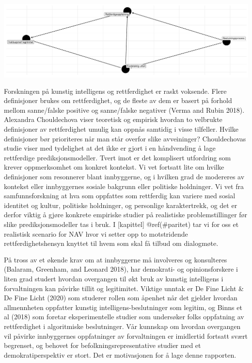 \documentclass[
]{book}
\begin{document}
\includegraphics{NAV_files/figure-latex/dag-1.pdf}

Forskningen på kunstig intelligens og rettferdighet er raskt voksende.
Flere definisjoner brukes om rettferdighet, og de fleste av dem er basert på forhold mellom sanne/falske positive og sanne/falske negativer (Verma and Rubin 2018).
Alexandra Chouldechova \citet{chouldechova2018case} viser teoretisk og empirisk hvordan to velbrukte definisjoner av rettferdighet umulig kan oppnås samtidig i visse tilfeller.
Hvilke definisjoner bør prioriteres når man står overfor slike avveininger?
Chouldechovas studie viser med tydelighet at det ikke er gjort i en håndvending å lage rettferdige prediksjonsmodeller.
Tvert imot er det komplisert utfordring som krever oppmerksomhet om konkret kontekst.
Vi vet fortsatt lite om hvilke definisjoner som resonnerer blant innbyggerne, og i hvilken grad de modereres av kontekst eller innbyggernes sosiale bakgrunn eller politiske holdninger.
Vi vet fra samfunnsforskning at hva som oppfattes som rettferdig kan variere med sosial identitet og kultur, politiske holdninger, og personlige karaktertrekk, og det er derfor viktig å gjøre konkrete empiriske studier på realistiske problemstillinger før slike prediksjonsmodeller tas i bruk.
I {[}kapittel{]} @ref(\#paritet) tar vi for oss et realistisk scenario for NAV hvor vi setter opp to motstridende rettferdighetshensyn knyttet til hvem som skal få tilbud om dialogmøte.

På tross av et økende krav om at innbyggerne må involveres og konsulteres (Balaram, Greenham, and Leonard 2018), har demokrati- og opinionsforskere i liten grad studert hvordan overgangen til økt bruk av kunstig intelligens i forvaltningen kan påvirke tillit og legitimitet.
Viktige unntak er De Fine Licht \& De Fine Licht (2020) som studerer rollen som åpenhet når det gjelder hvordan allmennheten oppfatter kunstig intelligens-beslutninger som legitim, og Binns et al (2018) som foretar eksperimentelle studier som undersøker folks oppfatning av rettferdighet i algoritmiske beslutninger.
Vår kunnskap om hvordan overgangen vil påvirke innbyggernes oppfatninger av forvaltningen er imidlertid fortsatt svært begrenset, og behovet for befolkningsrepresentative studier med et demokratiperspektiv er stort.
Det er motivasjonen for å lage denne rapporten.
\end{document}
